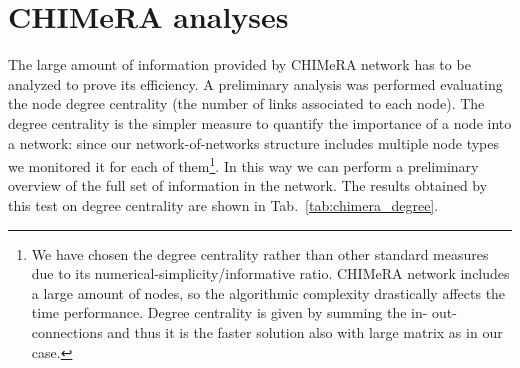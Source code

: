 \documentclass{standalone}
\begin{document}
\section[CHIMeRA analyses]{CHIMeRA analyses}\label{chimera:res}

The large amount of information provided by \textsf{CHIMeRA} network has to be analyzed to prove its efficiency.
A preliminary analysis was performed evaluating the node degree centrality (the number of links associated to each node).
The degree centrality is the simpler measure to quantify the importance of a node into a network: since our network-of-networks structure includes multiple node types we monitored it for each of them\footnote{
  We have chosen the degree centrality rather than other standard measures due to its numerical-simplicity/informative ratio.
  \textsf{CHIMeRA} network includes a large amount of nodes, so the algorithmic complexity drastically affects the time performance.
  Degree centrality is given by summing the in- out-connections and thus it is the faster solution also with large matrix as in our case.
}.
In this way we can perform a preliminary overview of the full set of information in the network.
The results obtained by this test on degree centrality are shown in Tab.~\ref{tab:chimera_degree}.
\end{document}
